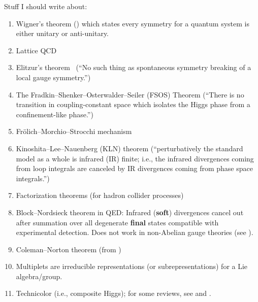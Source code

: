 Stuff I should write about:
\begin{enumerate}
\item Wigner's theorem () which states every symmetry
  for a quantum system is either unitary or anti-unitary.
\item Lattice QCD~\cite{Lepage:1998dt}
\item Elitzur's theorem~\cite{Elitzur:1975im} (``No such thing as spontaneous symmetry breaking of a local gauge symmetry.'')
\item The Fradkin--Shenker--Osterwalder--Seiler (FSOS) Theorem (``There is no transition in coupling-constant space which isolates the Higgs phase from a confinement-like phase.'')
\item Fr\"{o}lich--Morchio--Strocchi mechanism
\item Kinoshita--Lee--Nauenberg (KLN) theorem (``perturbatively the standard model as a whole is infrared (IR) finite; i.e., the infrared divergences coming from loop integrals are canceled by IR divergences coming from phase space integrals.'')
\item Factorization theorems (for hadron collider processes) 
\item Block--Nordsieck theorem in QED: Infrared (\textbf{soft}) divergences
  cancel out after summation over all degenerate \textbf{final} states
  compatible with experimental detection. Does not work in non-Abelian
  gauge theories (see {\tt{}}).
\item Coleman--Norton theorem (from {\tt{}})
\item Multiplets are irreducible representations (or subrepresentations)
  for a Lie algebra/group.
\item Technicolor (i.e., composite Higgs); for some reviews, see
   and .
\end{enumerate}





